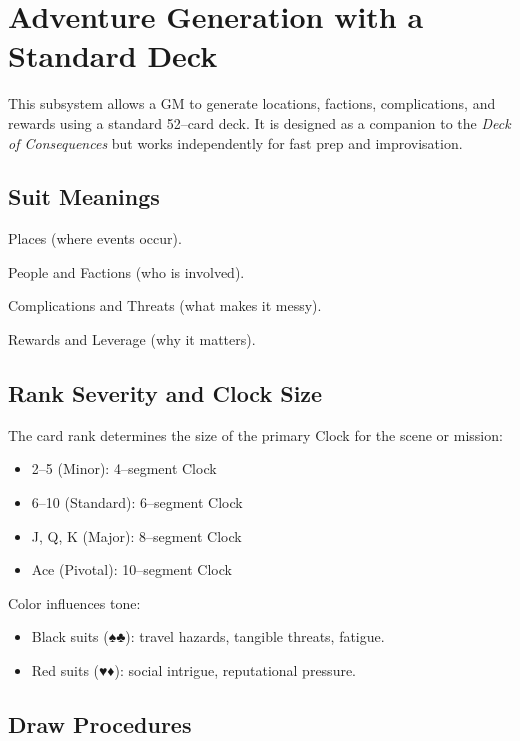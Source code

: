 \documentclass[12pt]{book}
\begin{document}
\section{Adventure Generation with a Standard Deck}

This subsystem allows a GM to generate locations, factions, complications, and rewards using a standard 52--card deck. It is designed as a companion to the \emph{Deck of Consequences} but works independently for fast prep and improvisation.

\subsection{Suit Meanings}
\begin{description}[leftmargin=2cm]
  \item[Spades:] Places (where events occur).
  \item[Hearts:] People and Factions (who is involved).
  \item[Clubs:] Complications and Threats (what makes it messy).
  \item[Diamonds:] Rewards and Leverage (why it matters).
\end{description}

\subsection{Rank Severity and Clock Size}
The card rank determines the size of the primary Clock for the scene or mission:
\begin{itemize}
  \item 2--5 (Minor): 4--segment Clock
  \item 6--10 (Standard): 6--segment Clock
  \item J, Q, K (Major): 8--segment Clock
  \item Ace (Pivotal): 10--segment Clock
\end{itemize}

Color influences tone:
\begin{itemize}
  \item Black suits (♠♣): travel hazards, tangible threats, fatigue.
  \item Red suits (♥♦): social intrigue, reputational pressure.
\end{itemize}

\subsection{Draw Procedures}
\end{document}

